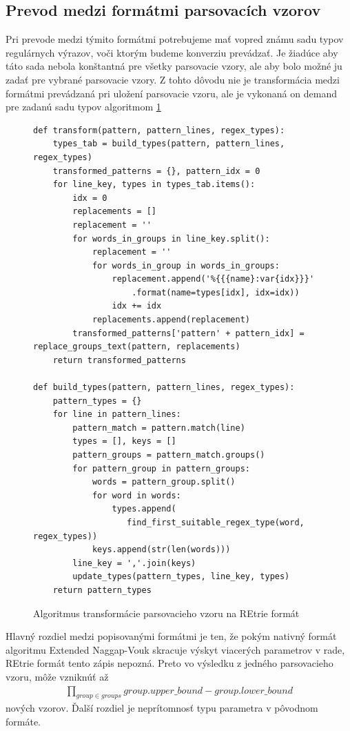 \subsection{Prevod medzi formátmi parsovacích vzorov}
\label{sec:format-transformation}

Pri prevode medzi týmito formátmi potrebujeme mať vopred známu sadu typov regulárnych výrazov, voči ktorým budeme konverziu prevádzať. Je žiadúce aby táto sada nebola konštantná pre všetky parsovacie vzory, ale aby bolo možné ju zadať pre vybrané parsovacie vzory. Z tohto dôvodu nie je transformácia medzi formátmi prevádzaná pri uložení parsovacie vzoru, ale je vykonaná on demand pre zadanú sadu typov algoritmom \ref{fig:pattern-transformation}

\begin{figure}[htbp]
\centering
\begin{minipage}{0.9\textwidth}
\lstset{columns=flexible,breaklines=true,breakatwhitespace=true, showstringspaces=false}
\begin{lstlisting}
def transform(pattern, pattern_lines, regex_types):
    types_tab = build_types(pattern, pattern_lines, regex_types)
    transformed_patterns = {}, pattern_idx = 0
    for line_key, types in types_tab.items():
        idx = 0
        replacements = []
        replacement = ''
        for words_in_groups in line_key.split():
            replacement = ''
            for words_in_group in words_in_groups:
                replacement.append('%{{{name}:var{idx}}}'
                    .format(name=types[idx], idx=idx))
                idx += idx
            replacements.append(replacement)   
        transformed_patterns['pattern' + pattern_idx] = replace_groups_text(pattern, replacements)
    return transformed_patterns

def build_types(pattern, pattern_lines, regex_types):
    pattern_types = {}
    for line in pattern_lines:
        pattern_match = pattern.match(line)
        types = [], keys = []
        pattern_groups = pattern_match.groups()
        for pattern_group in pattern_groups:
            words = pattern_group.split()
            for word in words:
                types.append(
                   find_first_suitable_regex_type(word, regex_types))
            keys.append(str(len(words)))
        line_key = ','.join(keys)
        update_types(pattern_types, line_key, types)
    return pattern_types
\end{lstlisting} 		
\end{minipage} 
\caption{Algoritmus transformácie parsovacieho vzoru na REtrie formát}
\label{fig:pattern-transformation}
\end{figure}

Hlavný rozdiel medzi popisovanými formátmi je ten, že pokým nativný formát algoritmu Extended Naggap-Vouk skracuje výskyt viacerých parametrov v rade, REtrie formát tento zápis nepozná. Preto vo výsledku z jedného parsovacieho vzoru, môže vzniknúť až 
\begin{align*}
\prod_{group \in groups} group.upper\_bound - group.lower\_bound
\end{align*}
nových vzorov. Ďalší rozdiel je neprítomnosť typu parametra v pôvodnom formáte.

